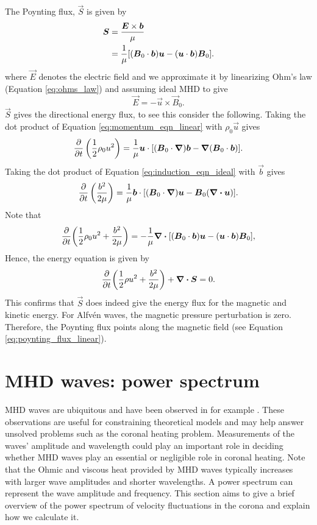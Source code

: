 The Poynting flux, $\vec{S}$ is given by
\begin{equation}
    \label{eq:poynting_flux_linear}
    \begin{aligned}
    \boldsymbol{S}&=\frac{\boldsymbol{E}\times\boldsymbol{b}}{\mu} \\
    & = \frac{1}{\mu}\qty[(\boldsymbol{B}_0\cdot\boldsymbol{b})\boldsymbol{u}-(\boldsymbol{u}\cdot\boldsymbol{b})\boldsymbol{B}_0].
    \end{aligned}
\end{equation}
where $\vec{E}$ denotes the electric field and we approximate it by linearizing Ohm's law (Equation \eqref{eq:ohms_law}) and assuming ideal MHD to give
\begin{equation}
    \label{eq:ideal_linear_ohms_law}
    \vec{E}=-\vec{u}\times\vec{B}_0.
\end{equation}
$\vec{S}$ gives the directional energy flux, to see this consider the following.
Taking the dot product of Equation \eqref{eq:momentum_eqn_linear} with $\rho_0 \vec{u}$ gives
\[\pdv{}{t}\left(\frac{1}{2}\rho_0 u^2\right)=\frac{1}{\mu}\boldsymbol{u}\cdot\qty[(\boldsymbol{B}_0\cdot\boldsymbol{\nabla})\boldsymbol{b}-\boldsymbol{\nabla}(\boldsymbol{B}_0\cdot\boldsymbol{b})].\]
Taking the dot product of Equation \eqref{eq:induction_eqn_ideal} with $\vec{b}$ gives
\[\pdv{}{t}\left(\frac{b^2}{2\mu}\right)=\frac{1}{\mu}\boldsymbol{b}\cdot\qty[(\boldsymbol{B}_0\cdot\boldsymbol{\nabla})\boldsymbol{u}-\boldsymbol{B}_0(\div\boldsymbol{u})].\]
Note that
\[\pdv{}{t}\qty(\frac{1}{2}\rho_0 u^2 + \frac{b^2}{2\mu})=-\frac{1}{\mu}\div\qty[(\boldsymbol{B}_0\cdot\boldsymbol{b})\boldsymbol{u} - (\boldsymbol{u}\cdot\boldsymbol{b})\boldsymbol{B}_0],\]
Hence, the energy equation is given by
\begin{equation}
    \label{eq:total_energy_eqn_linear}
    \pdv{}{t}\qty(\frac{1}{2}\rho u^2+\frac{b^2}{2\mu}) + \div{\boldsymbol{S}}=0.
\end{equation}
This confirms that $\vec{S}$ does indeed give the energy flux for the magnetic and kinetic energy. For Alfv\'en waves, the magnetic pressure perturbation is zero. Therefore, the Poynting flux points along the magnetic field (see Equation \eqref{eq:poynting_flux_linear}).


\section{MHD waves: power spectrum}
\label{sec:mhd_waves_power_spectrum}

MHD waves are ubiquitous and have been observed in for example \citet{Tomczyk2007,McIntosh2011,DeMoortel2012}. These observations are useful for constraining theoretical models and may help answer unsolved problems such as the coronal heating problem. Measurements of the waves' amplitude and wavelength could play an important role in deciding whether MHD waves play an essential or negligible role in coronal heating. Note that the Ohmic and viscous heat provided by MHD waves typically increases with larger wave amplitudes and shorter wavelengths.  A power spectrum can represent the wave amplitude and frequency. This section aims to give a brief overview of the power spectrum of velocity fluctuations in the corona and explain how we calculate it.

